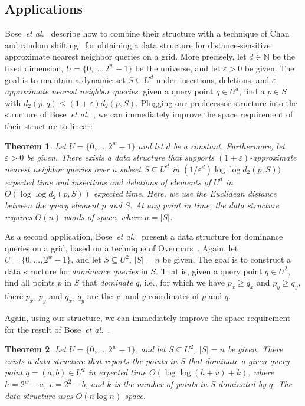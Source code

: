 \documentclass[a4paper,11pt]{article}
\newtheorem{theorem}{Theorem}[section]
\newcommand{\eps}{\varepsilon}
\newcommand{\N}{\mathbb{N}}
\newcommand{\etal}{\emph{et al.}\xspace}
\newcommand{\?}{\mskip1.5mu}
\begin{document}
\subsection{Applications}

Bose~\etal~\cite{BoseDoDuHoMo13} describe how to combine their structure
with a technique of Chan~\cite{Chan02} and random 
shifting~\cite[Chapter~11]{HarPeled11} for obtaining a data structure for 
distance-sensitive
approximate nearest neighbor queries on a grid.
More precisely, let $d \in \N$ be the fixed dimension, 
$U = \{0, \dots, 2^{w}-1\}$ be the universe, and
let $\eps > 0$ be given.
The goal is to maintain a dynamic set $S \subseteq U^d$ under
insertions, deletions, and \emph{$\eps$-approximate
nearest neighbor queries}: given a query point $q \in U^d$,
find a $p \in S$ with $d_2(p,q) \leq (1+\eps)d_2(p, S)$.
Plugging our predecessor structure into the structure of
Bose~\etal~\cite[Theorem~9]{BoseDoDuHoMo13}, we can
immediately improve the space requirement of their structure to linear:
\begin{theorem}
Let $U = \{0, \dots, 2^w-1\}$ and let $d$ be a constant.
Furthermore, let $\eps > 0$ be given.
There exists a data structure that supports $(1+\eps)$-approximate
nearest neighbor queries over a subset $S \subseteq U^d$ in 
$(1/\eps^d)\log\log d_2(p, S))$ expected time and insertions and deletions
of elements of $U^d$ in $O(\log\log d_2(p, S))$ expected time.
Here, we use the Euclidean distance between the query element $p$
and $S$. At any point in time, the data structure requires $O(n)$
words of space, where $n  = |S|$.
\end{theorem}

As a second application, Bose~\etal~\cite{BoseDoDuHoMo13}
present a data structure for dominance queries on a grid,
based on a technique of Overmars~\cite{Overmars88}.
Again, let $U = \{0, \dots, 2^w-1\}$, and let $S \subseteq U^2$,
$|S| = n$ be given. The goal is to construct a data structure
for \emph{dominance queries} in $S$. That is, given a query point
$q \in U^2$, find all points $p$ in $S$ that \emph{dominate} $q$,
i.e., for which we have $p_x \geq q_x$ and $p_y \geq q_y$, there
$p_x$, $p_y$ and $q_x$, $q_y$ are the $x$- and $y$-coordinates 
of $p$ and $q$.

Again, using our structure, we can immediately improve the
space requirement for the result of 
Bose~\etal~\cite[Theorem~10, Corollary~13]{BoseDoDuHoMo13}.

\begin{theorem}
Let $U = \{0, \dots, 2^w-1\}$, and let $S \subseteq U^2$, $|S|=n$
be given. There exists a data structure that reports the points in $S$
that dominate a given query point $q = (a,b) \in U^2$ in expected time
$O(\log\log(h+v) + k)$, where $h = 2^w - a$, $v = 2^2-b$, and $k$
is the number of points in $S$ dominated by $q$.
The data structure uses $O(n \log n)$ space.
\end{theorem}
\end{document}
